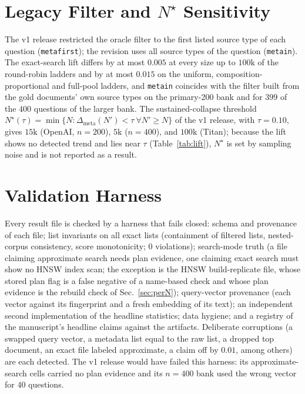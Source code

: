 \documentclass{ieeeaccess}
\makeatletter
\DeclareRobustCommand{\_}{\ifmmode\nfss@text{\textunderscore}\else\textunderscore\allowbreak\fi}
\makeatother
\begin{document}
\section{Legacy Filter and $N^\star$ Sensitivity}
\label{app:legacy}
\label{app:nstar}
The v1 release restricted the oracle filter to the first listed source type of each question (\texttt{meta\_first}); the revision uses all source types of the question (\texttt{meta\_in}). The exact-search lift differs by at most $0.005$ at every size up to $100\text{k}$ of the round-robin ladders and by at most $0.015$ on the uniform, composition-proportional and full-pool ladders, and \texttt{meta\_in} coincides with the filter built from the gold documents' own source types on the primary-200 bank and for $399$ of the $400$ questions of the larger bank. The sustained-collapse threshold $N^\star(\tau)=\min\{N:\Delta_{\mathrm{meta}}(N')<\tau\ \forall N'\ge N\}$ of the v1 release, with $\tau{=}0.10$, gives $15\text{k}$ (OpenAI, $n{=}200$), $5\text{k}$ ($n{=}400$), and $100\text{k}$ (Titan); because the lift shows no detected trend and lies near $\tau$ (Table~\ref{tab:lift}), $N^\star$ is set by sampling noise and is not reported as a result.

\section{Validation Harness}
\label{app:integrity}
Every result file is checked by a harness that fails closed: schema and provenance of each file; list invariants on all exact lists (containment of filtered lists, nested-corpus consistency, score monotonicity; $0$ violations); search-mode truth (a file claiming approximate search needs plan evidence, one claiming exact search must show no HNSW index scan; the exception is the HNSW build-replicate file, whose stored plan flag is a false negative of a name-based check and whose plan evidence is the rebuild check of Sec.~\ref{sec:perN}); query-vector provenance (each vector against its fingerprint and a fresh embedding of its text); an independent second implementation of the headline statistics; data hygiene; and a registry of the manuscript's headline claims against the artifacts. Deliberate corruptions (a swapped query vector, a metadata list equal to the raw list, a dropped top document, an exact file labeled approximate, a claim off by $0.01$, among others) are each detected. The v1 release would have failed this harness: its approximate-search cells carried no plan evidence and its $n{=}400$ bank used the wrong vector for $40$ questions.
\end{document}
